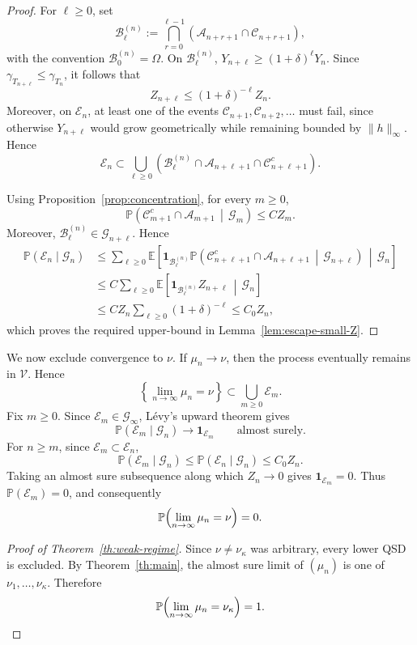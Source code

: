 \documentclass[10pt,letterpaper]{article}
\theoremstyle{compactplain}
\theoremstyle{compactdefinition}
\newcommand{\1}{\mathds{1}}
\begin{document}
\begin{proof}
For \(\ell\geq0\), set
\[
\mathcal B_\ell^{(n)}
:=
\bigcap_{r=0}^{\ell-1}
\left(
\mathcal A_{n+r+1}\cap\mathcal C_{n+r+1}
\right),
\]
with the convention \(\mathcal B_0^{(n)}=\Omega\). On \(\mathcal B_\ell^{(n)}\),
\(Y_{n+\ell}\geq(1+\delta)^\ell Y_n\). Since
\(\gamma_{T_{n+\ell}}\leq\gamma_{T_n}\), it follows that
\[
Z_{n+\ell}\leq(1+\delta)^{-\ell}Z_n.
\]
Moreover, on \(\mathcal E_n\), at least one of the events
\(\mathcal C_{n+1},\mathcal C_{n+2},\ldots\) must fail, since otherwise
\(Y_{n+\ell}\) would grow geometrically while remaining bounded by
\(\|h\|_\infty\). Hence
\[
\mathcal E_n
\subset
\bigcup_{\ell\geq0}
\left(
\mathcal B_\ell^{(n)}
\cap\mathcal A_{n+\ell+1}
\cap\mathcal C_{n+\ell+1}^c
\right).
\]

Using Proposition~\ref{prop:concentration}, for every \(m\geq0\),
\[
\mathbb P\left(
\mathcal C_{m+1}^c\cap\mathcal A_{m+1}
\,\middle|\,
\mathcal G_m
\right)
\leq
C Z_m.
\]
Moreover, \(\mathcal B_\ell^{(n)}\in\mathcal G_{n+\ell}\). Hence
\[
\begin{aligned}
\mathbb P(\mathcal E_n\mid\mathcal G_n)
&\leq
\sum_{\ell\geq0}
\mathbb E\left[
\mathbf 1_{\mathcal B_\ell^{(n)}}
\mathbb P\left(
\mathcal C_{n+\ell+1}^c\cap\mathcal A_{n+\ell+1}
\,\middle|\,
\mathcal G_{n+\ell}
\right)
\,\middle|\,
\mathcal G_n
\right] \\
&\leq
C\sum_{\ell\geq0}
\mathbb E\left[
\mathbf 1_{\mathcal B_\ell^{(n)}} Z_{n+\ell}
\,\middle|\,
\mathcal G_n
\right] \\
&\leq
C Z_n\sum_{\ell\geq0}(1+\delta)^{-\ell} \leq C_0Z_n,
\end{aligned}
\]
which proves the required upper-bound in Lemma~\ref{lem:escape-small-Z}.
\end{proof}

We now exclude convergence to \(\nu\). If \(\mu_n\to\nu\), then the process
eventually remains in \(\mathcal V\). Hence
\[
\left\{\lim_{n\to\infty}\mu_n=\nu\right\}
\subset
\bigcup_{m\geq0}\mathcal E_m.
\]
Fix \(m\geq0\). Since \(\mathcal E_m\in\mathcal G_\infty\), Lévy's upward theorem gives
\[
\mathbb P(\mathcal E_m\mid\mathcal G_n)
\longrightarrow
\mathbf 1_{\mathcal E_m}
\qquad\text{almost surely}.
\]
For \(n\geq m\), since \(\mathcal E_m\subset\mathcal E_n\),
\[
\mathbb P(\mathcal E_m\mid\mathcal G_n)
\leq
\mathbb P(\mathcal E_n\mid\mathcal G_n)
\leq
C_0Z_n.
\]
Taking an almost sure subsequence along which \(Z_n\to0\) gives
\(\mathbf 1_{\mathcal E_m}=0\). Thus
\(\mathbb P(\mathcal E_m)=0\), and consequently
\[
\mathbb P\Bigl(\lim_{n\to\infty}\mu_n=\nu\Bigr)=0.
\]
\begin{proof}[Proof of Theorem~\ref{th:weak-regime}]
Since \(\nu\neq\nu_\kappa\) was arbitrary, every lower QSD is excluded. By
Theorem~\ref{th:main}, the almost sure limit of \((\mu_n)\) is one of
\(\nu_1,\ldots,\nu_\kappa\). Therefore
\[
\mathbb P\Bigl(\lim_{n\to\infty}\mu_n=\nu_\kappa\Bigr)=1.
\]

\end{proof}
\end{document}
